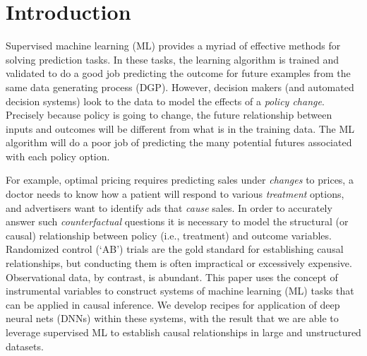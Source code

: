 \documentclass[12pt]{article}
\begin{document}
\newpage
{}
\pagestyle{plain}


\section{Introduction}


Supervised machine learning (ML) provides a myriad of effective methods for
solving prediction tasks.  
In these tasks, the learning algorithm is trained and
validated to do a good job predicting the outcome for future examples from the
same data generating process (DGP).  However, decision makers (and automated
decision systems)  look to the data to model the effects of a {\it policy
change}.   Precisely because  policy is going to change,  the future
relationship between inputs and outcomes will be different from what is in the
training data.  The ML algorithm will do a poor job of predicting the many
potential futures associated with each policy option.
 
For example, optimal pricing  requires predicting sales under {\it changes} to
prices, a doctor needs to know how a patient will respond to various {\it treatment}
options, and advertisers want to 
identify ads that {\it cause} sales.  In order to accurately answer such 
{\it counterfactual} questions it is necessary to model the structural (or causal)
relationship between policy (i.e., treatment) and outcome variables.  Randomized control
(`AB') trials are the gold standard for establishing causal relationships, but
conducting them is often impractical or excessively expensive. Observational
data, by contrast, is abundant. This paper uses the concept of instrumental variables to construct systems of machine learning (ML) tasks that can be applied in causal inference.  We develop recipes for application of deep neural nets (DNNs) within these systems, with the result that we are able to leverage supervised  ML to establish
causal relationships in large and unstructured  datasets.
\end{document}
